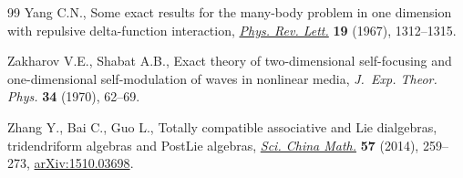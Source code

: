 \begin{thebibliography}{99}
Yang C.N., Some exact results for the many-body problem in one dimension with
 repulsive delta-function interaction,
 \href{https://doi.org/10.1103/PhysRevLett.19.1312}{\textit{Phys. Rev. Lett.}}
 \textbf{19} (1967), 1312--1315.

Zakharov V.E., Shabat A.B., Exact theory of two-dimensional self-focusing and
 one-dimensional self-modulation of waves in nonlinear media, \textit{J.~Exp.
 Theor. Phys.} \textbf{34} (1970), 62--69.

Zhang Y., Bai C., Guo L., Totally compatible associative and {L}ie dialgebras,
 tridendriform algebras and {P}ost{L}ie algebras,
 \href{https://doi.org/10.1007/s11425-013-4756-0}{\textit{Sci. China Math.}}
 \textbf{57} (2014), 259--273,
 \href{http://arxiv.org/abs/1510.03698}{arXiv:1510.03698}.

\end{thebibliography}
